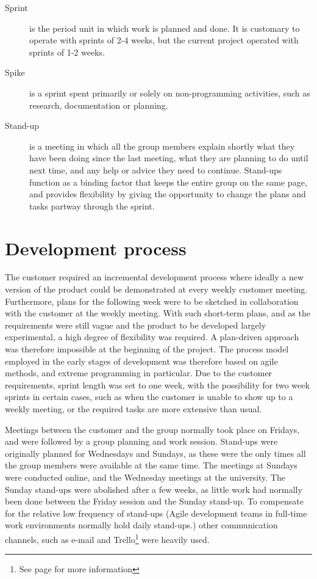 \begin{description}
\item[Sprint] \label{def:sprint} is the period unit in which work is planned and done. It is customary to operate with sprints of 2-4 weeks, but the current project operated with sprints of 1-2 weeks.

\item[Spike] \label{def:spike} is a sprint spent primarily or solely on non-programming activities, such as research, documentation or planning.

\item[Stand-up] \label{def:dailyScrum} is a meeting in which all the group members explain shortly what they have been doing since the last meeting, what they are planning to do until next time, and any help or advice they need to continue. Stand-ups function as a binding factor that keeps the entire group on the same page, and provides flexibility by giving the opportunity to change the plans and tasks partway through the sprint.

\end{description}

\section{Development process}
\label{def:devProcess}
The customer required an incremental development process where ideally a new version of the product could be demonstrated at every weekly customer meeting. Furthermore, plans for the following week were to be sketched in collaboration with the customer at the weekly meeting. With such short-term plans, and as the requirements were still vague and the product to be developed largely experimental, a high degree of flexibility was required. A plan-driven approach was therefore impossible at the beginning of the project. The process model employed in the early stages of development was therefore based on agile methods, and extreme programming in particular. Due to the customer requirements, sprint length was set to one week, with the possibility for two week sprints in certain cases, such as when the customer is unable to show up to a weekly meeting, or the required tasks are more extensive than usual. 

Meetings between the customer and the group normally took place on Fridays, and were followed by a group planning and work session. Stand-ups were originally planned for Wednesdays and Sundays, as these were the only times all the group members were available at the same time. The meetings at Sundays were conducted online, and the Wednesday meetings at the university. The Sunday stand-ups were abolished after a few weeks, as little work had normally been done between the Friday session and the Sunday stand-up. To compensate for the relative low frequency of stand-ups (Agile development teams in full-time work environments normally hold daily stand-ups.) other communication channels, such as e-mail and Trello\footnote{See page \pageref{def:trello} for more information} were heavily used.

